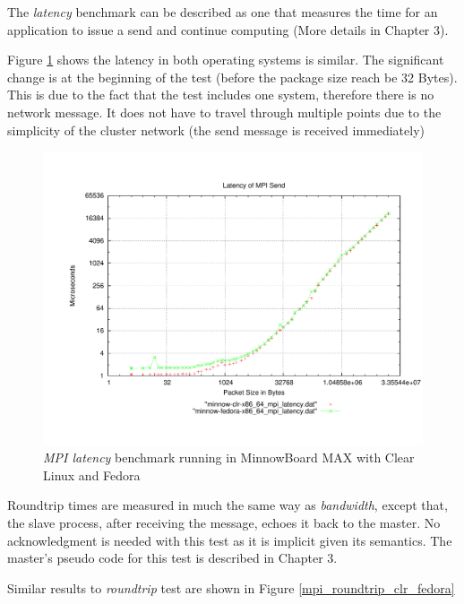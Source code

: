 The \textit{latency} benchmark can be described as one that measures the time
for an application to issue a send and continue computing (More details in
Chapter 3). 

Figure \ref{mpi_latency_clr_fedora} shows the latency in both operating systems
is similar. The significant change is at the beginning of the test (before the
package size reach be 32 Bytes). This is due to the fact that the test includes
one system, therefore there is no network message. It does not have
to travel through multiple points due to the simplicity of the cluster network
(the send message is received immediately) 

\begin{figure}[H]
\centering
\includegraphics[width=1 \textwidth]{images/mpbench_clr_experiments/mpi_latency.pdf}
\caption{\textit{MPI latency} benchmark running in  MinnowBoard MAX with Clear Linux and
Fedora}
\label{mpi_latency_clr_fedora}
\end{figure}

Roundtrip times are measured in much the same way as \textit{bandwidth}, except
that, the slave process, after receiving the message, echoes it back to the
master. No acknowledgment is needed with this test as it is implicit given its
semantics. The master's pseudo code for this test is described in Chapter 3.

Similar results to \textit{roundtrip} test are shown in Figure \ref{mpi_roundtrip_clr_fedora}

